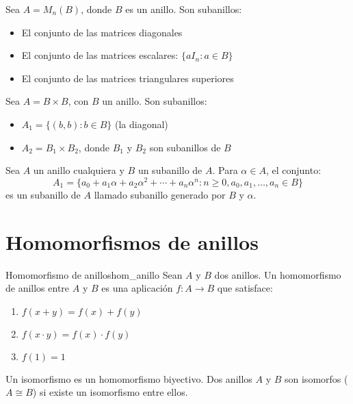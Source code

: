 \begin{example}{}{}
    Sea \(A = M_n(B)\), donde \(B\) es un anillo. Son subanillos:
    \begin{itemize}
        \item El conjunto de las matrices diagonales
        \item El conjunto de las matrices escalares: \(\{a I_n : a \in B\}\)
        \item El conjunto de las matrices triangulares superiores
    \end{itemize}
\end{example}

\begin{example}{}{}
    Sea \(A = B \times B\), con \(B\) un anillo. Son subanillos:
    \begin{itemize}
        \item \(A_1 = \{(b, b) : b \in B\}\) (la diagonal)
        \item \(A_2 = B_1 \times B_2\), donde \(B_1\) y \(B_2\) son subanillos de \(B\)
    \end{itemize}
\end{example}

\begin{example}{}{}
    Sea \(A\) un anillo cualquiera y \(B\) un subanillo de \(A\). Para \(\alpha \in A\), el conjunto:
    \[
    A_1 = \{a_0 + a_1\alpha + a_2\alpha^2 + \cdots + a_n\alpha^n : n \geq 0, a_0, a_1, \ldots, a_n \in B\}
    \]
    es un subanillo de \(A\) llamado {subanillo generado por \(B\) y \(\alpha\)}.
\end{example}

\clearpage
\section{Homomorfismos de anillos}

\begin{definition}{Homomorfismo de anillos}{hom_anillo}
    Sean \(A\) y \(B\) dos anillos. Un homomorfismo de anillos entre \(A\) y \(B\) es una aplicación \(f: A \to B\) que satisface:
    \begin{enumerate}
        \item \(f(x + y) = f(x) + f(y)\)
        \item \(f(x \cdot y) = f(x) \cdot f(y)\)
        \item \(f(1) = 1\)
    \end{enumerate}
    
    Un isomorfismo es un homomorfismo biyectivo. Dos anillos \(A\) y \(B\) son isomorfos (\(A \cong B\)) si existe un isomorfismo entre ellos.
\end{definition}

